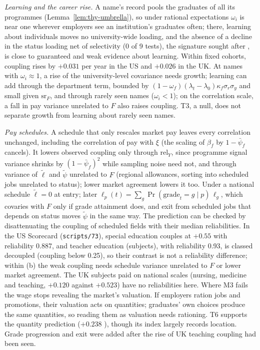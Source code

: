 \emph{Learning and the career rise.} A name's record pools the graduates of all its programmes
(Lemma~\ref{lem:thy-umbrella}), so under rational expectations $\omega_i$ is near one wherever employers see an
institution's graduates often; there, learning about individuals moves no university-wide loading, and the absence
of a decline in the status loading net of selectivity (0 of 9 tests), the signature sought after
\citet{altonji2001employer}, is close to guaranteed and weak evidence about learning. Within fixed cohorts, coupling
rises by $+0.031$ per year  in the US and $+0.026$ in the UK. At names with $\omega_i\approx1$, a
rise of the university-level covariance needs growth; learning can add through the department term, bounded by
$(1-\omega_f)(\lambda_t-\lambda_0)\kappa_f\sigma_r\sigma_y$ and small given $\mathrm{sr}_F$, and through rarely seen
names ($\omega_i<1$); on the correlation scale, a fall in pay variance unrelated to $F$ also raises coupling. T3, a
null, does not separate growth from learning about rarely seen names.

\emph{Pay schedules.} A schedule that only rescales market pay leaves every correlation unchanged, including the
correlation of pay with $\xi$ (the scaling of $\beta_f$ by $1-\bar\psi_f$ cancels). It lowers observed coupling only
through $\mathrm{rel}_Y$, since programme signal variance shrinks by $(1-\bar\psi_f)^2$ while sampling noise need
not, and through variance of $\tilde\ell$ and $\tilde\psi$ unrelated to $F$ (regional allowances, sorting into
scheduled jobs unrelated to status); lower market agreement lowers it too. Under a national schedule
$\tilde\ell=0$ at entry; later $\ell_p(t)=\sum_g\Pr(\text{grade}_t=g\mid p)\,\ell_g$, which covaries with $F$ only if
grade attainment does, and exit from scheduled jobs that depends on status moves $\tilde\psi$ in the same way. The
prediction can be checked by disattenuating the coupling of scheduled fields with their median reliabilities. In the
US Scorecard (\texttt{scripts/73}), special education couples at $+0.55$ with reliability 0.887, and teacher education
(subjects), with reliability 0.93, is classed decoupled (coupling below 0.25), so their contrast is not a
reliability difference; within (b) the weak coupling needs schedule variance unrelated to $F$ or lower market
agreement. The UK subjects paid on national scales (nursing, medicine and teaching, $+0.120$ against $+0.523$) have
no reliabilities here. Where M3 fails the wage stops revealing the market's valuation. If employers ration jobs and
promotions, their valuation acts on quantities; graduates' own choices produce the same quantities, so reading them
as valuation needs rationing. T6 supports the quantity prediction ($+0.238$ ), though its index
largely records location. Grade progression and exit were added after the rise of UK teaching coupling had been
seen.

